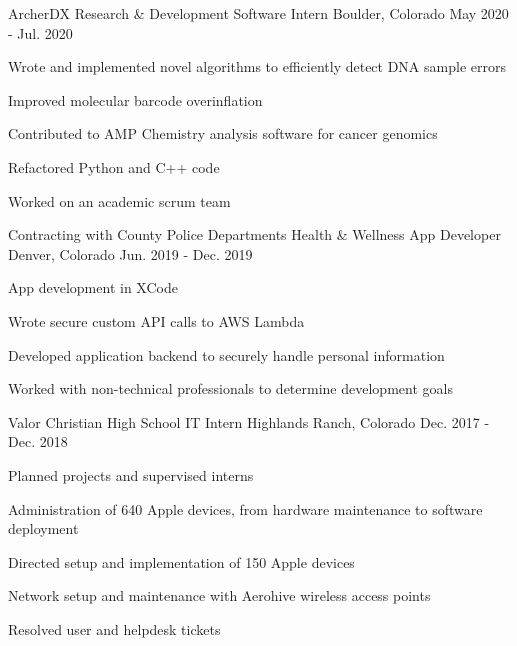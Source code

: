 


\begin{cventries}

  \cventry
    {ArcherDX}
    {Research \& Development Software Intern}
    {Boulder, Colorado}
    {May 2020 - Jul. 2020}
    {
      \begin{cvitems}
        \item{Wrote and implemented novel algorithms to efficiently detect DNA sample errors}
        \item{Improved molecular barcode overinflation}
        \item{Contributed to AMP Chemistry analysis software for cancer genomics}
        \item{Refactored Python and C++ code}
        \item{Worked on an academic scrum team}
      \end{cvitems}
    }

  \cventry
    {Contracting with County Police Departments} %
    {Health \& Wellness App Developer} %
    {Denver, Colorado} %
    {Jun. 2019 - Dec. 2019} %
    {
      \begin{cvitems} %
        \item {App development in XCode}
        \item {Wrote secure custom API calls to AWS Lambda}
        \item {Developed application backend to securely handle personal information}
        \item {Worked with non-technical professionals to determine development goals}
      \end{cvitems}
    }

  \cventry
    {Valor Christian High School} %
    {IT Intern} %
    {Highlands Ranch, Colorado} %
    {Dec. 2017 - Dec. 2018} %
    {
      \begin{cvitems} %
        \item {Planned projects and supervised interns}
        \item {Administration of 640 Apple devices, from hardware maintenance to software deployment}
        \item {Directed setup and implementation of 150 Apple devices}
        \item {Network setup and maintenance with Aerohive wireless access points}
        \item {Resolved user and helpdesk tickets}
      \end{cvitems}
    }


\end{cventries}

